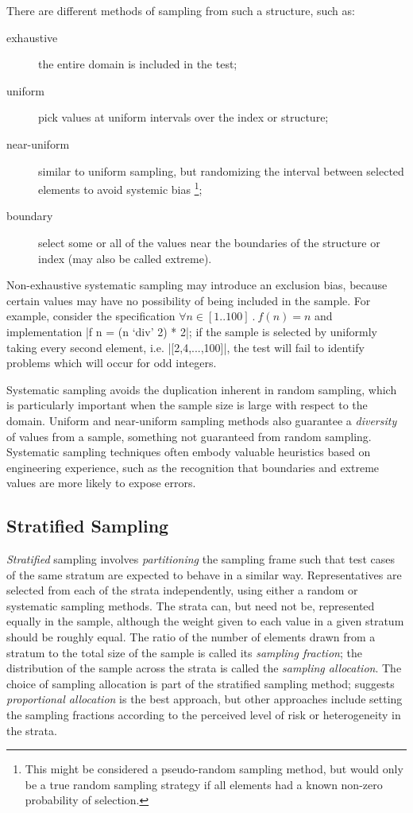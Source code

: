 There are different methods of sampling from such a structure, such as:

\begin{description}
\item[exhaustive] the entire domain is included in the test;
\item[uniform] pick values at uniform intervals over the index or structure;
\item[near-uniform] similar to uniform sampling, 
but randomizing the interval between selected elements to avoid systemic bias%
\footnote{This might be considered a pseudo-random sampling method,
but would only be a true random sampling strategy if 
all elements had a known non-zero probability of selection.};
\item[boundary] select some or all of 
the values near the boundaries of the structure or index
(may also be called extreme).
\end{description}

\noindent
Non-exhaustive systematic sampling may introduce an exclusion bias,
because certain values may have no possibility of being included in the sample.
For example, consider the specification $\forall n \in [1 .. 100]\ .\ f(n) = n$ 
and implementation |f n = (n `div' 2) * 2|;
if the sample is selected by uniformly taking every second element,
i.e. |[2,4,...,100]|, the test will fail to identify problems which will occur for odd integers.

Systematic sampling avoids the duplication inherent in random sampling,
which is particularly important when the sample size is large with respect to the domain.
Uniform and near-uniform sampling methods also guarantee a \emph{diversity}
of values from a sample, something not guaranteed from random sampling.
Systematic sampling techniques often embody valuable heuristics
based on engineering experience,
such as the recognition that boundaries and extreme values are 
more likely to expose errors.

\subsection{Stratified Sampling}\label{sub:stratified_sampling}

\emph{Stratified} sampling involves \emph{partitioning} the sampling frame such that 
test cases of the same stratum are expected to behave in a similar way.
Representatives are selected from each of the strata independently,
using either a random or systematic sampling methods.
The strata can, but need not be, represented equally in the sample,
although the weight given to each value in a given stratum should be roughly equal.
The ratio of the number of elements drawn from a stratum
to the total size of the sample is called its \emph{sampling fraction};
the distribution of the sample across the strata is called the \emph{sampling allocation}.
The choice of sampling allocation is part of the stratified sampling method;
\cite{Podgurski1999} suggests \emph{proportional allocation} is the best approach,
but other approaches include setting the sampling fractions
according to the perceived level of risk or heterogeneity in the strata.

